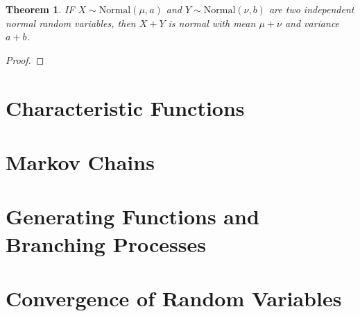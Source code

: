 \documentclass[12pt]{article}
\newtheorem{thm}{Theorem}[section]
\theoremstyle{definition}
\theoremstyle{remark}
\numberwithin{equation}{section}
\begin{document}
\begin{thm}
  IF $X\sim \text{Normal}(\mu, a)$ and $Y\sim \text{Normal}(\nu, b)$ are two independent normal random variables, then $X+Y$ is normal with mean $\mu + \nu$ and variance $a+b$.
\end{thm}


\begin{proof}
\end{proof}
  \section{Characteristic Functions}%
  \label{sec:characteristic_functions}
  
  \section{Markov Chains}%
  \label{sec:markov_chains}
  
  \section{Generating Functions and Branching Processes}%
  \label{sec:generating_functions_and_branching_processes}
  
  \section{Convergence of Random Variables}%
  \label{sec:convergence_of_random_variables} 
\end{document}
